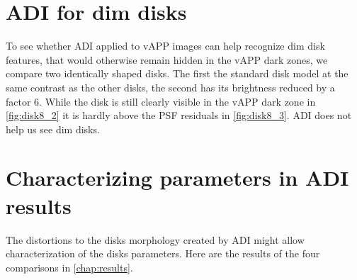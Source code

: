 \section{ADI for dim disks}
To see whether \ac{ADI} applied to \ac{vAPP} images can help recognize dim disk features, that would otherwise remain hidden in the \ac{vAPP} dark zones, we compare two identically shaped disks. The first the standard disk model at the same contrast as the other disks, the second has its brightness reduced by a factor 6. While the disk is still clearly visible in the \ac{vAPP} dark zone in \autoref{fig:disk8_2} it is hardly above the \ac{PSF} residuals in \autoref{fig:disk8_3}. \ac{ADI} does not help us see dim disks.

\section{Characterizing parameters in ADI results}
The distortions to the disks morphology created by \ac{ADI} might allow characterization of the disks parameters. Here are the results of the four comparisons in \autoref{chap:results}.


